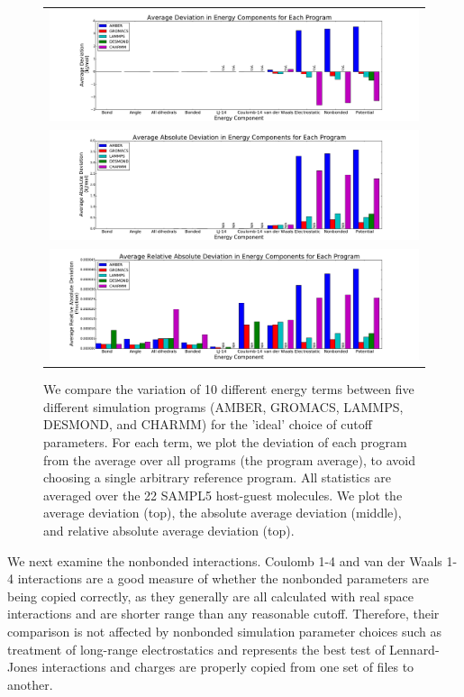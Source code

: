\begin{figure}[h]
\begin{tabular}{c}
\includegraphics[width=\textwidth]{AverageIdealSettings.pdf} \\  
\includegraphics[width=\textwidth]{AverageAbsoluteIdealSettings.pdf} \\  
\includegraphics[width=\textwidth]{AverageRelativeAbsoluteIdealSettings.pdf}
\end{tabular}
\caption{We compare the variation of 10 different energy terms between
  five different simulation programs (AMBER, GROMACS, LAMMPS, DESMOND,
  and CHARMM) for the 'ideal' choice of cutoff parameters. For each
  term, we plot the deviation of each program from the average over
  all programs (the program average), to avoid choosing a single
  arbitrary reference program. All statistics are averaged over the 22
  SAMPL5 host-guest molecules. We plot the average deviation (top),
  the absolute average deviation (middle), and relative absolute
  average deviation (top).
\label{fig:mainfig}}
\end{figure}

We next examine the nonbonded interactions. Coulomb 1-4 and van der
Waals 1-4 interactions are a good measure of whether the nonbonded
parameters are being copied correctly, as they generally are all
calculated with real space interactions and are shorter range than any
reasonable cutoff. Therefore, their comparison is not affected by
nonbonded simulation parameter choices such as treatment of long-range
electrostatics and represents the best test of Lennard-Jones
interactions and charges are properly copied from one set of files to
another.

